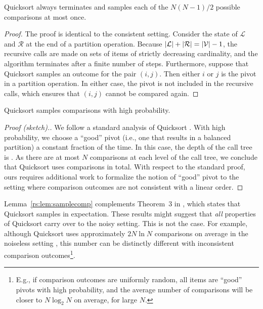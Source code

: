 \begin{lemma}
\label{rs:lem:termination}
Quicksort always terminates and samples each of the $N(N\!-\!1) / 2$ possible comparisons at most once.
\end{lemma}

\begin{proof}
The proof is identical to the consistent setting.
Consider the state of $\mathcal{L}$ and $\mathcal{R}$ at the end of a partition operation.
Because $\lvert\mathcal{L}\rvert + \lvert\mathcal{R}\rvert = \lvert\mathcal{V}\rvert - 1$, the recursive calls are made on sets of items of strictly decreasing cardinality, and the algorithm terminates after a finite number of steps.
Furthermore, suppose that Quicksort samples an outcome for the pair $(i, j)$.
Then either $i$ or $j$ is the pivot in a partition operation.
In either case, the pivot is not included in the recursive calls, which ensures that $(i, j)$ cannot be compared again.
\end{proof}

\begin{lemma}
\label{rs:lem:samplecomp}
Quicksort samples  comparisons with high probability.
\end{lemma}

\begin{proof}[Proof (sketch).]
We follow a standard analysis of Quicksort \citep[see, e.g.,][Section 3.3.3]{dubhashi2009concentration}.
With high probability, we choose a ``good'' pivot (i.e., one that results in a balanced partition) a constant fraction of the time.
In this case, the depth of the call tree is .
As there are at most $N$ comparisons at each level of the call tree, we conclude that Quicksort uses  comparisons in total.
With respect to the standard proof, ours requires additional work to formalize the notion of ``good'' pivot to the setting where comparison outcomes are not consistent with a linear order.
\end{proof}

Lemma~\ref{rs:lem:samplecomp} complements Theorem~$3$ in \citet{ailon2010preference}, which states that Quicksort samples  in expectation.
These results might suggest that \emph{all} properties of Quicksort carry over to the noisy setting.
This is not the case.
For example, although Quicksort uses approximately $2N \ln N$ comparisons on average in the noiseless setting \citep{sedgewick2011algorithms}, this number can be distinctly different with inconsistent comparison outcomes\footnote{E.g., if comparison outcomes are uniformly random, all items are ``good'' pivots with high probability, and the average number of comparisons will be closer to $N \log_2 N$ on average, for large $N$.}.

